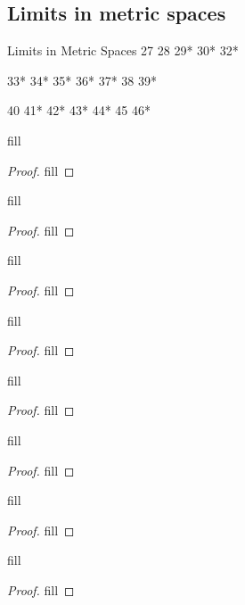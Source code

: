 \subsection{Limits in metric spaces}

Limits in Metric Spaces
27
28
29*
30*
32*

33*
34*
35*
36*
37*
38
39*

40
41*
42*
43*
44*
45
46*
\begin{exercise}{29}
fill
\end{exercise}
\begin{proof}
fill
\end{proof} 

\begin{exercise}{30}
fill
\end{exercise}
\begin{proof}
fill
\end{proof} 

\begin{exercise}{32}
fill
\end{exercise}
\begin{proof}
fill
\end{proof} 

\begin{exercise}{33}
fill
\end{exercise}
\begin{proof}
fill
\end{proof} 

\begin{exercise}{34}
fill
\end{exercise}
\begin{proof}
fill
\end{proof} 

\begin{exercise}{35}
fill
\end{exercise}
\begin{proof}
fill
\end{proof} 

\begin{exercise}{36}
fill
\end{exercise}
\begin{proof}
fill
\end{proof} 

\begin{exercise}{37}
fill
\end{exercise}
\begin{proof}
fill
\end{proof} 


